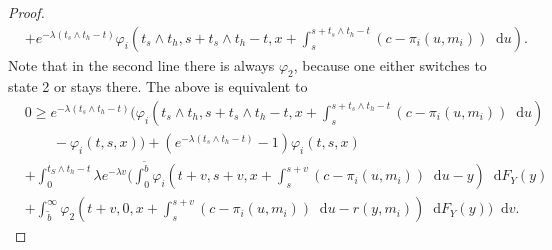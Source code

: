 \documentclass[a4paper]{scrartcl}
\theoremstyle{remark}
\theoremstyle{definition}
\numberwithin{equation}{section}
\newcommand*\diff{\mathop{}\!\mathrm{d}}
\begin{document}
\begin{proof}
\begin{align*}
     &+ e^{-\lambda (t_s \wedge t_h-t)} \varphi_i\left(t_s \wedge t_h,s+t_s \wedge t_h-t,x+\int_{s}^{s+t_s \wedge t_h-t}(c-\pi_i(u,m_i))\diff u\right).
\end{align*}
Note that in the second line there is always $\varphi_2$, because one either switches to state 2 or stays there. The above is equivalent to 
\begin{align*}
    &0\geq e^{-\lambda (t_s \wedge t_h-t)} \Biggl(\varphi_i\left(t_s \wedge t_h,s+t_s \wedge t_h-t,x+\int_{s}^{s+t_s \wedge t_h-t}(c-\pi_i(u,m_i))\diff u\right)\\&\qquad -\varphi_i(t,s,x)\Biggr) + (e^{-\lambda (t_s \wedge t_h-t)} -1)\varphi_i(t,s,x)\\
    &+\int_{0}^{t_S\wedge t_h-t} \lambda e^{-\lambda v} \Bigg(\int_0^{\tilde{b}} \varphi_i\left(t+v,s+v,x+\int_{s}^{s+v}(c-\pi_i(u,m_i))\diff u-y  \right)\diff F_Y(y) \\
     &+ \int_{\tilde{b}}^\infty \varphi_2\left(t+v,0,x+\int_{s}^{s+v}(c-\pi_i(u,m_i))\diff u-r(y,m_i)  \right)\diff F_Y(y)\Bigg) \diff v.
\end{align*}


\end{proof}
\end{document}
